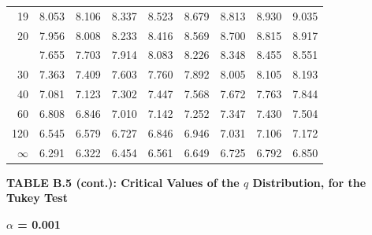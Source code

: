 \documentclass[10pt]{article}
\begin{document}
\begin{longtable}{@{}r!{\vrule width 0.8pt\hspace{0.55em}}rrrrrrrr@{}}
19 & 8.053 & 8.106 & 8.337 & 8.523 & 8.679 & 8.813 & 8.930 & 9.035 \\
20 & 7.956 & 8.008 & 8.233 & 8.416 & 8.569 & 8.700 & 8.815 & 8.917 \\
 & 7.655 & 7.703 & 7.914 & 8.083 & 8.226 & 8.348 & 8.455 & 8.551 \\
30 & 7.363 & 7.409 & 7.603 & 7.760 & 7.892 & 8.005 & 8.105 & 8.193 \\
40 & 7.081 & 7.123 & 7.302 & 7.447 & 7.568 & 7.672 & 7.763 & 7.844 \\
60 & 6.808 & 6.846 & 7.010 & 7.142 & 7.252 & 7.347 & 7.430 & 7.504 \\
120 & 6.545 & 6.579 & 6.727 & 6.846 & 6.946 & 7.031 & 7.106 & 7.172 \\
\addlinespace[0.30em]
$\infty$ & 6.291 & 6.322 & 6.454 & 6.561 & 6.649 & 6.725 & 6.792 & 6.850 \\
\end{longtable}
\newpage
\thispagestyle{empty}
\begin{center}
{\large\bfseries TABLE B.5 (cont.): Critical Values of the $q$ Distribution, for the Tukey Test\par}
\end{center}
{\large\bfseries $\alpha$ = 0.001\par}
\vspace{0.45em}
\small
\end{document}
